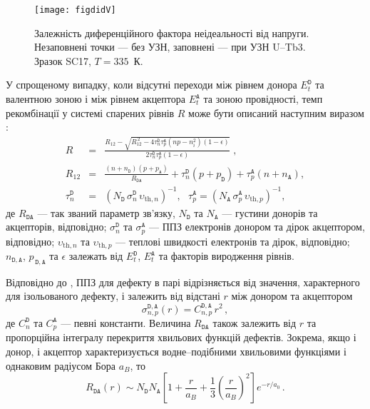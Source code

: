 \begin{figure}
\center
\texttt{[image: figdidV]}%
\caption{\label{figdidV}
Залежність диференційного фактора неідеальності від напруги.
Незаповнені точки --- без УЗН, заповнені --- при УЗН U--Tb3.
Зразок SC17, $T=335$~К.
}%
\end{figure}

У спрощеному випадку, коли відсутні переходи між рівнем донора $E_t^{\mathtt{D}}$ та валентною зоною
і між рівнем акцептора $E_t^{\mathtt{A}}$ та зоною провідності,
темп рекомбінації у системі спарених рівнів $R$ може бути описаний наступним виразом \cite{CDLR:JAP1995}:
\begin{eqnarray}
R&=&\frac{R_{12}-\sqrt{R_{12}^{\,2}-4\tau_{n}^{\mathtt{D}}\tau_{p}^{\mathtt{A}}(np-n_i^2)(1-\epsilon)}}{2\tau_{n}^{\mathtt{D}}\tau_{p}^{\mathtt{A}}(1-\epsilon)}\;,\label{eqR}\\
R_{12}&=&\frac{(n+n_{\mathtt{D}})(p+p_{\mathtt{A}})}{R_{\mathtt{DA}}}+
\tau_{n}^{\mathtt{D}}(p+p_{\mathtt{D}})+\tau_{p}^{\mathtt{A}}(n+n_{\mathtt{A}}),\label{eqR12}\\
\tau_{n}^{\mathtt{D}}&=&(N_{\mathtt{D}}\,\sigma_{n}^{\mathtt{D}}\,\upsilon_{\mathrm{th},n})^{-1},\,\,\,\,
\tau_{p}^{\mathtt{A}}=(N_{\mathtt{A}}\,\sigma_{p}^{\mathtt{A}}\,\upsilon_{\mathrm{th},p})^{-1},\label{eqTAU}
\end{eqnarray}
де
$R_{\mathtt{DA}}$ --- так званий параметр зв'язку,
$N_{\mathtt{D}}$ та $N_{\mathtt{A}}$ --- густини донорів та акцепторів, відповідно;
$\sigma_{n}^{\mathtt{D}}$ та $\sigma_{p}^{\mathtt{A}}$ --- ППЗ електронів донором та дірок акцептором, відповідно;
$\upsilon_{\mathrm{th},n}$ та $\upsilon_{\mathrm{th},p}$ --- теплові швидкості електронів та дірок, відповідно;
$n_{\mathtt{D,A}}$, $p_{\,\mathtt{D,A}}$ та $\epsilon$ залежать від $E_t^{\mathtt{D}}$, $E_t^{\mathtt{A}}$ та факторів виродження рівнів.

Відповідно до \cite{CDLR:JAP},
ППЗ для дефекту в парі відрізняється від значення, характерного для ізольованого дефекту, і залежить від відстані $r$ між донором та акцептором
\begin{equation}
\label{eqSigma}
\sigma_{n,p}^{\mathtt{D,A}}(r)=C_{n,p}^{\mathtt{D,A}}\,r^2\,,
\end{equation}
де $C_{n}^{\mathtt{D}}$ та $C_{p}^{\mathtt{A}}$ --- певні константи.
Величина $R_{\mathtt{DA}}$ також залежить від $r$ та пропорційна інтегралу перекриття хвильових функцій дефектів.
Зокрема, якщо і донор, і акцептор характеризується водне--подібними хвильовими функціями і однаковим радіусом Бора $a_B$, то \cite{CDLR:JAP}
\begin{equation}
\label{eqRda}
R_{\mathtt{DA}} (r) \sim N_{\mathtt{D}}N_{\mathtt{A}}\left[1+\frac{r}{a_B}+\frac{1}{3}\left(\frac{r}{a_B}\right)^2\right]
   e^{-r/a_0}\,.
\end{equation}

